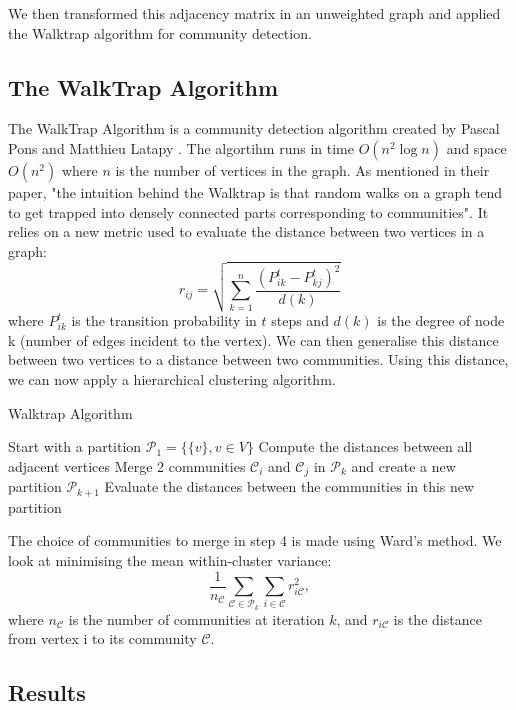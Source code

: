 \documentclass[twoside]{article}
\begin{document}
\begin{multicols}{2}
\noindent We then transformed this adjacency matrix in an unweighted graph and applied the Walktrap algorithm for community detection.\\

\subsection{The WalkTrap Algorithm}
The WalkTrap Algorithm is a community detection algorithm created by Pascal Pons and Matthieu Latapy \cite{Gr}. The algortihm runs in time $O(n^2\log n)$ and space $O(n^2)$ where $n$ is the number of vertices in the graph. As mentioned in their paper, "the intuition behind the Walktrap is that random walks on a graph tend to get trapped into densely connected parts corresponding to communities".\cite{Gr} It relies on a new metric used to evaluate the distance between two vertices in a graph:
 $$r_{ij} = \sqrt{\sum\limits_{k=1}^{n}\frac{(P^t_{ik}-P^t_{kj})^2}{d(k)}}$$
 where $P^t_{ik}$ is the transition probability in $t$ steps and $d(k)$ is the degree of node k (number of edges incident to the vertex). We can then generalise this distance between two vertices to a distance between two communities. Using this distance, we can now apply a hierarchical clustering algorithm.

\begin{algorithm}[H]
\caption{Walktrap Algorithm}\label{euclid}
\begin{algorithmic}[1]
\State Start with a partition $\mathcal{P}_1=\{\{v\}, v \in V\}$
\State Compute the distances between all adjacent vertices
\State Merge 2 communities $\mathcal{C}_i$ and $\mathcal{C}_j$ in $\mathcal{P}_k$ and create a new partition $\mathcal{P}_{k+1}$
\State Evaluate the distances between the communities in this new partition
\EndWhile
\end{algorithmic}
\end{algorithm}

\noindent The choice of communities to merge in step 4 is made using Ward's method. We look at minimising the mean within-cluster variance:
$$\frac{1}{n_\mathcal{C}}\sum\limits_{\mathcal{C}\in\mathcal{P}_{k}}\sum\limits_{i\in\mathcal{C}}r^2_{i\mathcal{C}},$$
\noindent where $n_\mathcal{C}$ is the number of communities at iteration $k$, and $r_{i\mathcal{C}}$ is the distance from vertex i to its community $\mathcal{C}$.\\

\subsection{Results}


\end{multicols}
\end{document}
